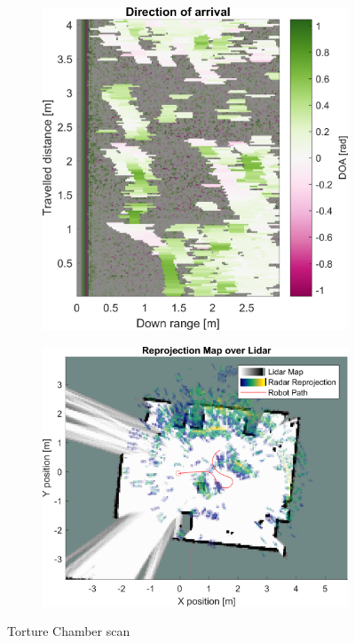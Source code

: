 \begin{figure}[htbp]
\begin{subfigure}[t]{0.475\linewidth}
    \end{subfigure}\bigskip\\
    \begin{subfigure}[t]{0.475\linewidth}
        \centering
        \includegraphics[width=\linewidth,max height=.475\textheight]{gfx/results/torturechamber_doa.png}
    \end{subfigure}%
    \hfill%
    \begin{subfigure}[t]{0.475\linewidth}
        \centering
        \includegraphics[width=\linewidth,max height=.475\textheight]{gfx/results/torturechamber_map.png}
    \end{subfigure}%
    \caption{Torture Chamber scan}
\end{figure}

